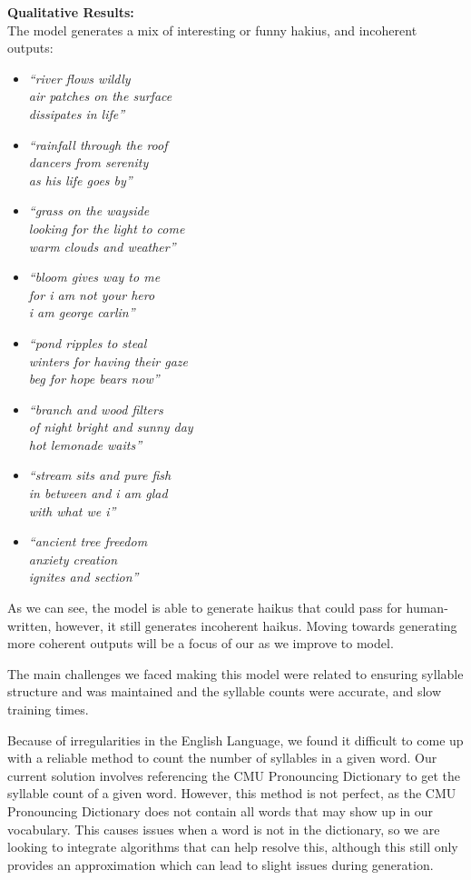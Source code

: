\documentclass{article} %
\begin{document}
\textbf{Qualitative Results:} \\
The model generates a mix of interesting or funny hakius, and incoherent outputs:
\begin{itemize}
  \item \textit{“river flows wildly \\
  air patches on the surface \\
  dissipates in life”}
  \item \textit{“rainfall through the roof \\
  dancers from serenity \\
  as his life goes by”}
  \item \textit{“grass on the wayside \\
  looking for the light to come \\
  warm clouds and weather”}
  \item \textit{“bloom gives way to me \\
  for i am not your hero \\ 
  i am george carlin”}
  \item \textit{“pond ripples to steal \\
  winters for having their gaze \\
  beg for hope bears now”}
  \item \textit{“branch and wood filters \\
  of night bright and sunny day \\
  hot lemonade waits”}
  \item \textit{“stream sits and pure fish \\
  in between and i am glad \\
  with what we i”}
  \item \textit{“ancient tree freedom \\
  anxiety creation \\
  ignites and section”}
\end{itemize}

As we can see, the model is able to generate haikus that could pass for human-written, however, it still generates
incoherent haikus. Moving towards generating more coherent outputs will be a focus of our as we improve to model.

The main challenges we faced making this model were 
related to ensuring syllable structure and was maintained and the syllable counts were accurate, and 
slow training times.

Because of irregularities in the English Language, we found it difficult to
come up with a reliable method to count the number of syllables in a given word. Our current solution involves referencing 
the CMU Pronouncing Dictionary \citep{cmu_pronouncing_dictionary} to get the syllable count of a given word.
However, this method is not perfect, as the CMU Pronouncing Dictionary does not contain all words that may show up in our vocabulary.
This causes issues when a word is not in the dictionary, so we are looking to integrate algorithms that can help resolve this, although this still only provides an approximation which can lead to slight issues during generation.
\end{document}
